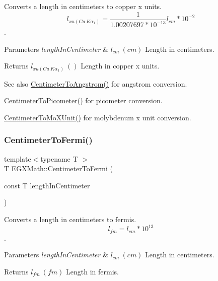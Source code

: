 Converts a length in centimeters to copper x units. \[ l_{xu(Cu\ K\alpha_1)}= \frac{1}{1.00207697*10^{-13}} l_{cm} * 10^{-2}\]. 


\begin{DoxyParams}{Parameters}
{\em length\+In\+Centimeter} & $ l_{cm}\ (cm)$ Length in centimeters. \\
\hline
\end{DoxyParams}
\begin{DoxyReturn}{Returns}
$ l_{xu(Cu\ K\alpha_1)}\ ()$ Length in copper x units. 
\end{DoxyReturn}
\begin{DoxySeeAlso}{See also}
\mbox{\hyperlink{group___e_g_x_math-_conversions-_length_conversions-_centimeter-_non-_s_i_gacabf2b01cd8676ffb5ec8c70ecd621b6}{Centimeter\+To\+Angstrom()}} for angstrom conversion. 

\mbox{\hyperlink{group___e_g_x_math-_conversions-_length_conversions-_centimeter-_s_i_ga7e2851b0052f1b135a84aa860495e4ba}{Centimeter\+To\+Picometer()}} for picometer conversion. 

\mbox{\hyperlink{group___e_g_x_math-_conversions-_length_conversions-_centimeter-_non-_s_i_ga4e94aa6f1cc6aaeb751384a8472b01fd}{Centimeter\+To\+Mo\+X\+Unit()}} for molybdenum x unit conversion. 
\end{DoxySeeAlso}
\mbox{\label{group___e_g_x_math-_conversions-_length_conversions-_centimeter-_non-_s_i_ga0b55e847f11e0ba8313d4556d23684dd}} 
\subsubsection{\texorpdfstring{Centimeter\+To\+Fermi()}{CentimeterToFermi()}}
{\footnotesize\ttfamily template$<$typename T $>$ \\
T E\+G\+X\+Math\+::\+Centimeter\+To\+Fermi (\begin{DoxyParamCaption}\item[{const T}]{length\+In\+Centimeter }\end{DoxyParamCaption})}



Converts a length in centimeters to fermis. \[ l_{fm}=l_{cm} * 10^{13} \]. 


\begin{DoxyParams}{Parameters}
{\em length\+In\+Centimeter} & $ l_{cm}\ (cm)$ Length in centimeters. \\
\hline
\end{DoxyParams}
\begin{DoxyReturn}{Returns}
$ l_{fm}\ (fm)$ Length in fermis. 
\end{DoxyReturn}
\mbox{\label{group___e_g_x_math-_conversions-_length_conversions-_centimeter-_non-_s_i_gaee509ac676e86ed54994792f82dab9f7}} 
